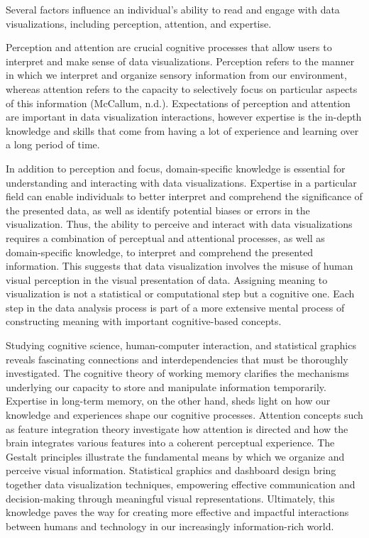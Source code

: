 \documentclass[print]{nuthesis}
\begin{document}
Several factors influence an individual's ability to read and engage with data visualizations, including perception, attention, and expertise.

Perception and attention are crucial cognitive processes that allow users to interpret and make sense of data visualizations.
Perception refers to the manner in which we interpret and organize sensory information from our environment, whereas attention refers to the capacity to selectively focus on particular aspects of this information (McCallum, n.d.).
Expectations of perception and attention are important in data visualization interactions, however expertise is the in-depth knowledge and skills that come from having a lot of experience and learning over a long period of time.

In addition to perception and focus, domain-specific knowledge is essential for understanding and interacting with data visualizations.
Expertise in a particular field can enable individuals to better interpret and comprehend the significance of the presented data, as well as identify potential biases or errors in the visualization.
Thus, the ability to perceive and interact with data visualizations requires a combination of perceptual and attentional processes, as well as domain-specific knowledge, to interpret and comprehend the presented information.
This suggests that data visualization involves the misuse of human visual perception in the visual presentation of data.
Assigning meaning to visualization is not a statistical or computational step but a cognitive one.
Each step in the data analysis process is part of a more extensive mental process of constructing meaning with important cognitive-based concepts.

Studying cognitive science, human-computer interaction, and statistical graphics reveals fascinating connections and interdependencies that must be thoroughly investigated.
The cognitive theory of working memory clarifies the mechanisms underlying our capacity to store and manipulate information temporarily.
Expertise in long-term memory, on the other hand, sheds light on how our knowledge and experiences shape our cognitive processes.
Attention concepts such as feature integration theory investigate how attention is directed and how the brain integrates various features into a coherent perceptual experience.
The Gestalt principles illustrate the fundamental means by which we organize and perceive visual information.
Statistical graphics and dashboard design bring together data visualization techniques, empowering effective communication and decision-making through meaningful visual representations.
Ultimately, this knowledge paves the way for creating more effective and impactful interactions between humans and technology in our increasingly information-rich world.
\end{document}
